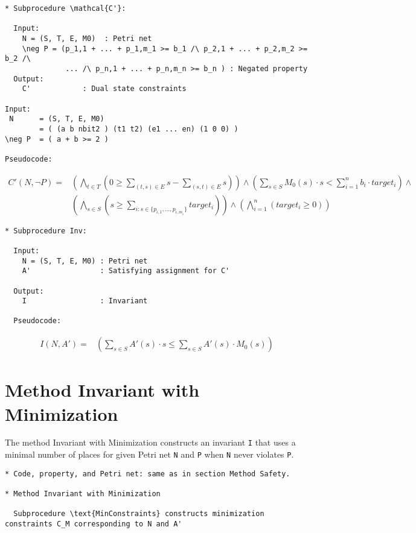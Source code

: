 \documentclass{llncs}
\begin{document}
\newpage
\begin{verbatim}
* Subprocedure \mathcal{C'}:

  Input:
    N = (S, T, E, M0)  : Petri net
    \neg P = (p_1,1 + ... + p_1,m_1 >= b_1 /\ p_2,1 + ... + p_2,m_2 >= b_2 /\
              ... /\ p_n,1 + ... + p_n,m_n >= b_n ) : Negated property
  Output:
    C'            : Dual state constraints

Input:
 N      = (S, T, E, M0)
        = ( (a b nbit2 ) (t1 t2) (e1 ... en) (1 0 0) )
\neg P  = ( a + b >= 2 )

Pseudocode:
\end{verbatim}

\begin{align*}
  C'(N, \neg P) =& \left( \bigwedge_{t \in T} \left( 0 \ge
                      \sum_{(t, s) \in E} s
                    - \sum_{(s, t) \in E} s \right) \right) \land
     \left( \sum_{s \in S} M_0(s) \cdot s <
       \sum_{i=1}^n b_i \cdot target_i \right) \land \\
     & \left( \bigwedge_{s \in S} \left ( s \ge 
       \sum_{i : s \in \{ p_{i,1}, \ldots, p_{i,m_i} \} } target_i \right) \right) \land
     \left( \bigwedge_{i=1}^n \left( target_i \ge 0 \right) \right)
\end{align*}

\begin{verbatim}
* Subprocedure Inv:

  Input:
    N = (S, T, E, M0) : Petri net
    A'                : Satisfying assignment for C'

  Output:
    I                 : Invariant

  Pseudocode:
\end{verbatim}

\begin{align*}
  I(N, A') =& \left( \sum_{s \in S} A'(s) \cdot s \le
                     \sum_{s \in S} A'(s) \cdot M_0(s) \right)
\end{align*}

\newpage
\section{Method Invariant with Minimization}

The method Invariant with Minimization constructs an invariant \verb=I=
that uses a minimal number of places for given Petri net \verb=N= and
\verb=P= when \verb=N= never violates \verb=P=. 

\begin{verbatim}
* Code, property, and Petri net: same as in section Method Safety.

* Method Invariant with Minimization

  Subprocedure \text{MinConstraints} constructs minimization constraints C_M corresponding to N and A'
\end{verbatim}
\end{document}
